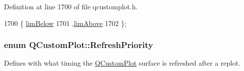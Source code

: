 Definition at line 1700 of file qcustomplot.\+h.


\begin{DoxyCode}
1700                        \{ \hyperlink{class_q_custom_plot_a75a8afbe6ef333b1f3d47abb25b9add7aee39cf650cd24e68552da0b697ce4a93}{limBelow}  
1701                          ,\hyperlink{class_q_custom_plot_a75a8afbe6ef333b1f3d47abb25b9add7a062b0b7825650b432a713c0df6742d41}{limAbove} 
1702                        \};
\end{DoxyCode}
\hypertarget{class_q_custom_plot_a45d61392d13042e712a956d27762aa39}{}
\subsubsection[{Refresh\+Priority}]{\setlength{\rightskip}{0pt plus 5cm}enum {\bf Q\+Custom\+Plot\+::\+Refresh\+Priority}}\label{class_q_custom_plot_a45d61392d13042e712a956d27762aa39}
Defines with what timing the \hyperlink{class_q_custom_plot}{Q\+Custom\+Plot} surface is refreshed after a replot.


